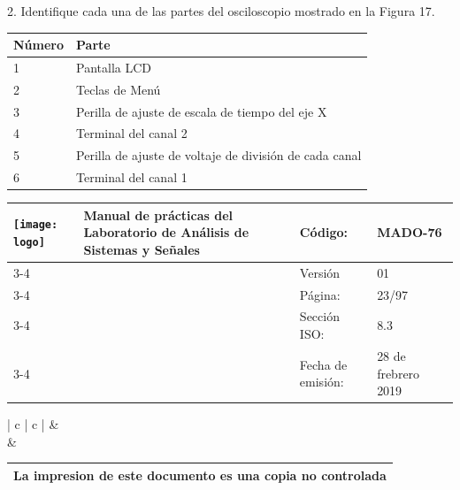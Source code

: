 \hspace{1cm}

2. Identifique cada una de las partes del osciloscopio mostrado en la Figura 17.

\hspace{1cm}

\begin{tabular}{|l|l|}
	\hline
	Número & Parte  \\
	\hline
	1 & Pantalla LCD \\
	\hline
	2 & Teclas de Menú \\
	\hline
	3 & Perilla de ajuste de escala de tiempo del eje X  \\
	\hline
	4 &  Terminal del canal 2 \\
	\hline
	5 & Perilla de ajuste de voltaje de división de cada canal  \\
	\hline
	6 &  Terminal del canal 1 \\
	\hline
\end{tabular}






\centering
\begin{tabular}{ |	p{30 mm}|	p{61 mm}	|	p{33mm}	| p{43mm}	| } 
	\hline
	\multirow{4}{30mm}{\centering \texttt{[image: logo]}} &
	\multirow{4}{61mm}{\centering \textbf{ \textbf{Manual de prácticas del Laboratorio de Análisis de Sistemas y Señales}}}    & Código: & MADO-76 \\
	\cline{3-4}
	& &  Versión & 01 \\
	\cline{3-4}
	& & Página: & 23/97 \\ \cline{3-4}
	& & Sección ISO: & 8.3 \\ \cline{3-4}
	& & Fecha de emisión: & 28 de frebrero 2019 \\
	\hline
\end{tabular}
\begin{tabular}{ |	c |	c	| } 
	 &
	   \\
	& \\ \hline
\end{tabular}
\begin{tabular}{|p{180mm}|}
	\multirow{1}{180mm}{ \centering La impresion de este documento es una copia no controlada }  \\ \hline \end{tabular} \\
\vspace{1cm}

